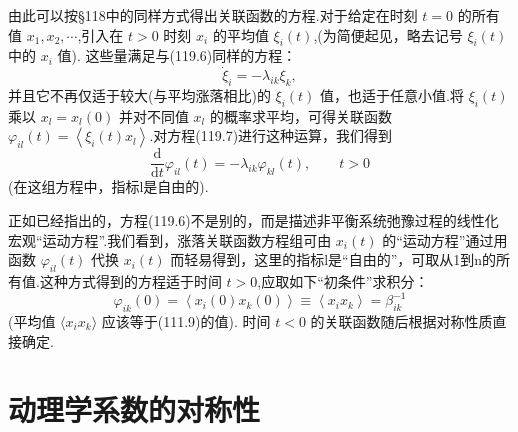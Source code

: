由此可以按§118中的同样方式得出关联函数的方程.对于给定在时刻 $t=0$ 的所有值 $x_1,x_2,\cdots$,引入在 $t>0$ 时刻 $x_i$ 的平均值 $\xi_i(t)$,(为简便起见，略去记号 $\xi_i(t)$ 中的 $x_i$ 值). 这些量满足与(119.6)同样的方程：
\begin{equation}
  \dot{\xi}_i=-\lambda_{ik}\xi_k,
\end{equation}
并且它不再仅适于较大(与平均涨落相比)的 $\xi_i(t)$ 值，也适于任意小值.将 $\xi_i(t)$ 乘以 $x_l=x_l(0)$ 并对不同值 $x_l$ 的概率求平均，可得关联函数 $\varphi_{il}(t)=\left\langle\xi_i(t)x_l\right\rangle$.对方程(119.7)进行这种运算，我们得到
\begin{equation}
  \frac{\mathrm{d}}{\mathrm{d}t}\varphi_{il}(t)=-\lambda_{ik}\varphi_{kl}(t),
  \qquad t>0
\end{equation}
(在这组方程中，指标l是自由的).

正如已经指出的，方程(119.6)不是别的，而是描述非平衡系统弛豫过程的线性化宏观“运动方程”.我们看到，涨落关联函数方程组可由 $x_i(t)$ 的“运动方程”通过用函数 $\varphi_{il}(t)$ 代换 $x_i(t)$ 而轻易得到，这里的指标l是“自由的”，可取从1到n的所有值.这种方式得到的方程适于时间 $t>0$,应取如下“初条件”求积分：
\begin{equation}
  \varphi_{ik}(0)=\left\langle x_i(0)x_k(0)\right\rangle\equiv
  \left\langle x_ix_k\right\rangle=\beta^{-1}_{ik}
\end{equation}
(平均值 $\langle x_ix_k\rangle$ 应该等于(111.9)的值). 时间 $t<0$ 的关联函数随后根据对称性质直接确定.

\section{动理学系数的对称性}

